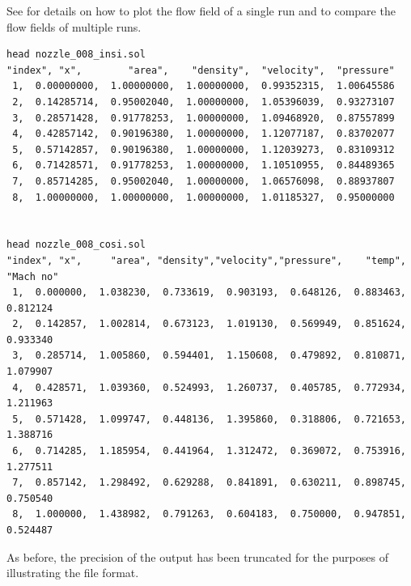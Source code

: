 See  for details on how to plot the flow field of a single run and
to compare the flow fields of multiple runs.


\begin{verbatim}
head nozzle_008_insi.sol 
"index", "x",        "area",    "density",  "velocity",  "pressure"
 1,  0.00000000,  1.00000000,  1.00000000,  0.99352315,  1.00645586
 2,  0.14285714,  0.95002040,  1.00000000,  1.05396039,  0.93273107
 3,  0.28571428,  0.91778253,  1.00000000,  1.09468920,  0.87557899
 4,  0.42857142,  0.90196380,  1.00000000,  1.12077187,  0.83702077
 5,  0.57142857,  0.90196380,  1.00000000,  1.12039273,  0.83109312
 6,  0.71428571,  0.91778253,  1.00000000,  1.10510955,  0.84489365
 7,  0.85714285,  0.95002040,  1.00000000,  1.06576098,  0.88937807
 8,  1.00000000,  1.00000000,  1.00000000,  1.01185327,  0.95000000


head nozzle_008_cosi.sol 
"index", "x",     "area", "density","velocity","pressure",    "temp",  "Mach no"
 1,  0.000000,  1.038230,  0.733619,  0.903193,  0.648126,  0.883463,  0.812124
 2,  0.142857,  1.002814,  0.673123,  1.019130,  0.569949,  0.851624,  0.933340
 3,  0.285714,  1.005860,  0.594401,  1.150608,  0.479892,  0.810871,  1.079907
 4,  0.428571,  1.039360,  0.524993,  1.260737,  0.405785,  0.772934,  1.211963
 5,  0.571428,  1.099747,  0.448136,  1.395860,  0.318806,  0.721653,  1.388716
 6,  0.714285,  1.185954,  0.441964,  1.312472,  0.369072,  0.753916,  1.277511
 7,  0.857142,  1.298492,  0.629288,  0.841891,  0.630211,  0.898745,  0.750540
 8,  1.000000,  1.438982,  0.791263,  0.604183,  0.750000,  0.947851,  0.524487

\end{verbatim}

As before, the precision of the output has been truncated for the purposes of illustrating 
the file format.


